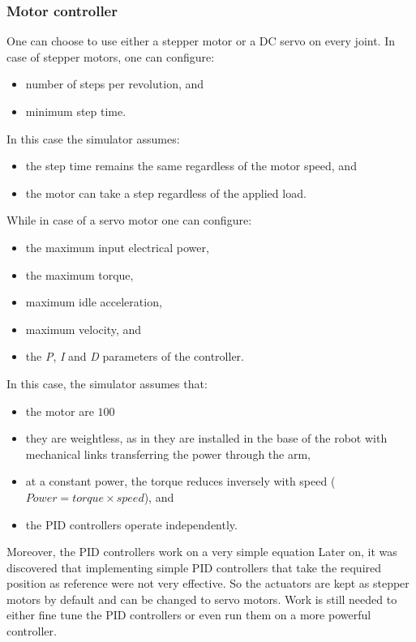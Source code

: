 {    \subsubsection{Motor controller}
    One can choose to use either a stepper motor or a DC servo on every joint. In case of stepper motors, one can configure:
    \begin{itemize}
      \item number of steps per revolution, and
      \item minimum step time.
    \end{itemize}
    In this case the simulator assumes:
    \begin{itemize}
      \item the step time remains the same regardless of the motor speed, and
      \item the motor can take a step regardless of the applied load.
    \end{itemize}
    While in case of a servo motor one can configure:
    \begin{itemize}
      \item the maximum input electrical power,
      \item the maximum torque,
      \item maximum idle acceleration,
      \item maximum velocity, and
      \item the \emph{P}, \emph{I} and \emph{D} parameters of the controller.
    \end{itemize}
    In this case, the simulator assumes that:
    \begin{itemize}
      \item the motor are $100$~%
      \item they are weightless, as in they are installed in the base of the robot with mechanical links transferring the power through the arm,
      \item at a constant power, the torque reduces inversely with speed ($Power = torque \times speed$), and
      \item the PID controllers operate independently.
    \end{itemize}

    Moreover, the PID controllers work on a very simple equation
    Later on, it was discovered that implementing simple PID controllers that take the required position as reference were not very effective. So the actuators are kept as stepper motors by default and can be changed to servo motors. Work is still needed to either fine tune the PID controllers or even run them on a more powerful controller.

}
